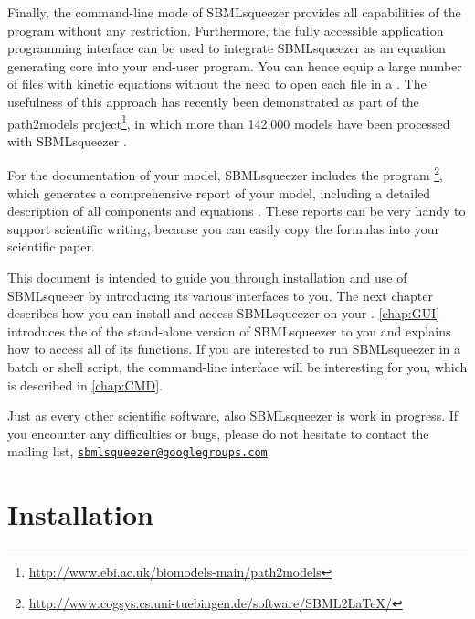 Finally, the command-line mode of SBMLsqueezer provides all capabilities of the
program without any restriction.
Furthermore, the fully accessible application programming interface can be used
to integrate SBMLsqueezer as an equation generating core into your end-user
program.
You can hence equip a large number of files with kinetic equations without the
need to open each file in a \GUI.
The usefulness of this approach has recently been demonstrated as part of the
path2models project\footnote{\url{http://www.ebi.ac.uk/biomodels-main/path2models}},
in which more than 142,000 \SBML models have been processed with SBMLsqueezer
\citep{Buechel2013}.

For the documentation of your model, SBMLsqueezer includes the program
\SBMLLaTeX\footnote{\url{http://www.cogsys.cs.uni-tuebingen.de/software/SBML2LaTeX/}},
which generates a comprehensive report of your model, including a detailed
description of all components and equations \citep{Draeger2009b, Draeger2010a}.
These reports can be very handy to support scientific writing, because you can
easily copy the formulas into your scientific paper.

This document is intended to guide you through installation and use of
SBMLsqueeer by introducing its various interfaces to you. The next chapter
describes how you can install and access SBMLsqueezer on your \OS.
\vref{chap:GUI} introduces the \GUI of the stand-alone
version of SBMLsqueezer to you and explains how to access all of its functions.
If you are interested to run SBMLsqueezer in a batch or shell script, the
command-line interface will be interesting for you, which is described in
\vref{chap:CMD}.

Just as every other scientific software, also SBMLsqueezer is work in progress.
If you encounter any difficulties or bugs, please do not hesitate to contact
the mailing list,
\href{mailto:sbmlsqueezer@googlegroups.com}{\texttt{sbmlsqueezer@google\-groups.com}}. 




\chapter{Installation}

